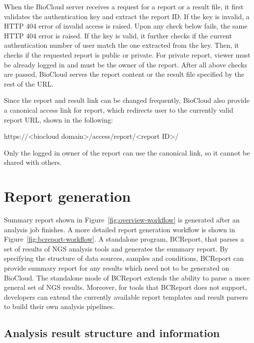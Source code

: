When the BioCloud server receives a request for a report or a result file, it
first validates the authentication key and extract the report ID. If the key is
invalid, a HTTP 404 error of invalid access is raised. Upon any check below
fails, the same HTTP 404 error is raised. If the key is valid, it further
checks if the current authentication number of user match the one extracted
from the key. Then, it checks if the requested report is public or private. For
private report, viewer must be already logged in and must be the owner of the
report. After all above checks are passed, BioCloud serves the report content
or the result file specified by the rest of the URL.

Since the report and result link can be changed frequently, BioCloud also
provide a canonical access link for report, which redirects user to the
currently valid report URL, shown in the following:

\begin{CVerbatim}[fontsize=\small]
https://<biocloud domain>/access/report/<report ID>/
\end{CVerbatim}

\vspace{-1em}\noindent
Only the logged in owner of the report can use the canonical link, so it cannot
be shared with others.



\section{Report generation}
\label{s:report-generation}

Summary report shown in Figure~\ref{fig:overview-workflow} is generated after
an analysis job finishes. A more detailed report generation workflow is shown
in Figure~\ref{fig:bcreport-workflow}. A standalone program, BCReport, that
parses a set of results of NGS analysis tools and generates the summary report.
By specifying the structure of data sources, samples and conditions, BCReport
can provide summary report for any results which need not to be generated on
BioCloud. The standalone mode of BCReport extends the ability to parse a more
general set of NGS results. Moreover, for tools that BCReport does not support,
developers can extend the currently available report templates and result
parsers to build their own analysis pipelines.




\subsection{Analysis result structure and information}

